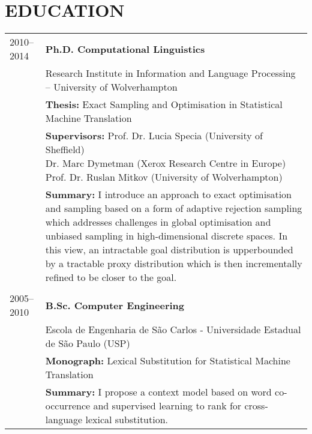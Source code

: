 \section*{EDUCATION}

\begin{tabular}{p{2cm}  p{13.92cm}}
2010--2014 & \bf Ph.D. Computational Linguistics  \\
 & Research Institute in Information and Language Processing – University of Wolverhampton \\
 & {\bf Thesis:} Exact Sampling and Optimisation in Statistical Machine Translation \\
 & {\bf Supervisors:} \pbox[t]{13.92cm}{Prof. Dr. Lucia Specia (University of Sheffield) \\ Dr. Marc Dymetman (Xerox Research Centre in Europe) \\ Prof. Dr. Ruslan Mitkov (University of Wolverhampton)} \\
 & {\bf Summary:} I introduce an approach to exact optimisation and sampling based on a form of adaptive rejection sampling which addresses challenges in global optimisation and unbiased sampling in high-dimensional discrete spaces. In this view, an intractable goal distribution is upperbounded by a tractable proxy distribution which is then incrementally refined to be closer to the goal. \\ %
 & \\
2005--2010 	& \bf B.Sc. Computer Engineering  \\ %
 & Escola de Engenharia de S\~ao Carlos - Universidade Estadual de S\~ao Paulo (USP) \\
 & {\bf Monograph:} Lexical Substitution for Statistical Machine Translation \\
 & {\bf Summary:} I propose a context model based on word co-occurrence and supervised learning to rank for cross-language lexical substitution. %
\end{tabular}

